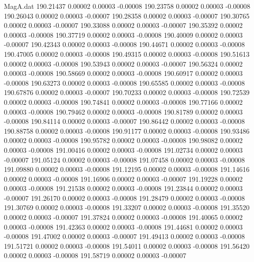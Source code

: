 \begin{filecontents}{MagA.dat}
 190.21437    0.00002    0.00003   -0.00008
 190.23758    0.00002    0.00003   -0.00008
 190.26043    0.00002    0.00003   -0.00007
 190.28358    0.00002    0.00003   -0.00007
 190.30765    0.00002    0.00003   -0.00007
 190.33088    0.00002    0.00003   -0.00007
 190.35392    0.00002    0.00003   -0.00008
 190.37719    0.00002    0.00003   -0.00008
 190.40009    0.00002    0.00003   -0.00007
 190.42343    0.00002    0.00003   -0.00008
 190.44671    0.00002    0.00003   -0.00008
 190.47005    0.00002    0.00003   -0.00008
 190.49315    0.00002    0.00003   -0.00008
 190.51613    0.00002    0.00003   -0.00008
 190.53943    0.00002    0.00003   -0.00007
 190.56324    0.00002    0.00003   -0.00008
 190.58669    0.00002    0.00003   -0.00008
 190.60917    0.00002    0.00003   -0.00008
 190.63273    0.00002    0.00003   -0.00008
 190.65585    0.00002    0.00003   -0.00008
 190.67876    0.00002    0.00003   -0.00007
 190.70233    0.00002    0.00003   -0.00008
 190.72539    0.00002    0.00003   -0.00008
 190.74841    0.00002    0.00003   -0.00008
 190.77166    0.00002    0.00003   -0.00008
 190.79462    0.00002    0.00003   -0.00008
 190.81789    0.00002    0.00003   -0.00008
 190.84114    0.00002    0.00003   -0.00007
 190.86442    0.00002    0.00003   -0.00008
 190.88758    0.00002    0.00003   -0.00008
 190.91177    0.00002    0.00003   -0.00008
 190.93486    0.00002    0.00003   -0.00008
 190.95782    0.00002    0.00003   -0.00008
 190.98082    0.00002    0.00003   -0.00008
 191.00416    0.00002    0.00003   -0.00008
 191.02734    0.00002    0.00003   -0.00007
 191.05124    0.00002    0.00003   -0.00008
 191.07458    0.00002    0.00003   -0.00008
 191.09880    0.00002    0.00003   -0.00008
 191.12195    0.00002    0.00003   -0.00008
 191.14616    0.00002    0.00003   -0.00008
 191.16906    0.00002    0.00003   -0.00007
 191.19228    0.00002    0.00003   -0.00008
 191.21538    0.00002    0.00003   -0.00008
 191.23844    0.00002    0.00003   -0.00007
 191.26170    0.00002    0.00003   -0.00008
 191.28479    0.00002    0.00003   -0.00008
 191.30769    0.00002    0.00003   -0.00008
 191.33207    0.00002    0.00003   -0.00008
 191.35520    0.00002    0.00003   -0.00007
 191.37824    0.00002    0.00003   -0.00008
 191.40065    0.00002    0.00003   -0.00008
 191.42363    0.00002    0.00003   -0.00008
 191.44681    0.00002    0.00003   -0.00008
 191.47002    0.00002    0.00003   -0.00007
 191.49413    0.00002    0.00003   -0.00008
 191.51721    0.00002    0.00003   -0.00008
 191.54011    0.00002    0.00003   -0.00008
 191.56420    0.00002    0.00003   -0.00008
 191.58719    0.00002    0.00003   -0.00007

\end{filecontents}

